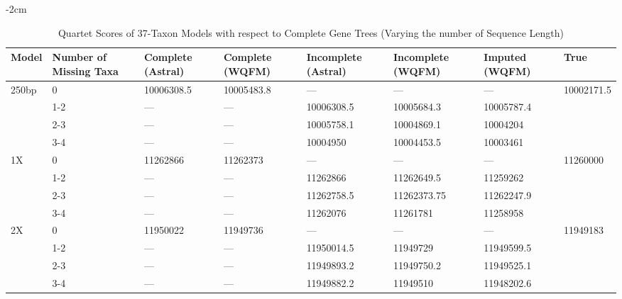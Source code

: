 
\begin{table}[H]
  \small
  \centering
    \addtolength{\leftskip} {-2cm} %
    \addtolength{\rightskip}{-2cm}
    \caption{Quartet Scores of 37-Taxon Models with respect to Complete Gene Trees (Varying the number of Sequence Length)}
    \label{tab:qscore-37-seq-complete}
\begin{tabularx}{1.2\textwidth}{|X|X|X|X|X|X|X|X|}


\hline
    Model & Number of Missing Taxa  & Complete (Astral)  & Complete (WQFM) & Incomplete (Astral) & Incomplete (WQFM)  &	Imputed (WQFM) & True \\
    \hline\hline
    \multirow{4}{0.25\textwidth}{250bp} 
    & 0   & 10006308.5	& 10005483.8 & --- & --- & --- & \multirow{4}{0.25\textwidth}{ 10002171.5}  \\ \cline{2-7}
    & 1-2 & --- & --- &	10006308.5  & 10005684.3	
    & 10005787.4 &  \\ \cline{2-7}
    & 2-3 & --- & ---  &	10005758.1  &	10004869.1
    & 10004204 & \\ \cline{2-7}
    & 3-4 & ---	& ---  &	10004950		
    & 10004453.5	& 10003461 & \\ \cline{2-7}
    \hline
    
    \multirow{4}{0.25\textwidth}{1X} 
    & 0 & 11262866 & 11262373 & --- & --- & --- & \multirow{4}{0.25\textwidth}{11260000}  \\ \cline{2-7}
    & 1-2 & --- & ---  &	11262866 & 11262649.5
    &	11259262 &  \\ \cline{2-7}
    & 2-3 & --- &	---	 &	11262758.5	&	11262373.75
    & 11262247.9 &  \\ \cline{2-7}
    & 3-4 & --- &	---  & 11262076	
	 &	11261781  &	11258958 &   \\ \cline{2-7}
    \hline
    
    \multirow{4}{0.25\textwidth}{2X} 
    & 0 & 11950022 &	11949736 & --- & --- & --- & \multirow{4}{0.25\textwidth}{11949183}  \\ \cline{2-7}
    & 1-2 & --- &	---  &	11950014.5	
    &	11949729  &	11949599.5 & \\ \cline{2-7}
    & 2-3 & --- &	---  &	11949893.2		
    &	11949750.2  &	11949525.1 &  \\ \cline{2-7}
    & 3-4 & --- &	---  &	11949882.2		
    &	11949510  & 11948202.6 &  \\ \cline{2-7}
    
    \hline
        
    
\end{tabularx}

\end{table}